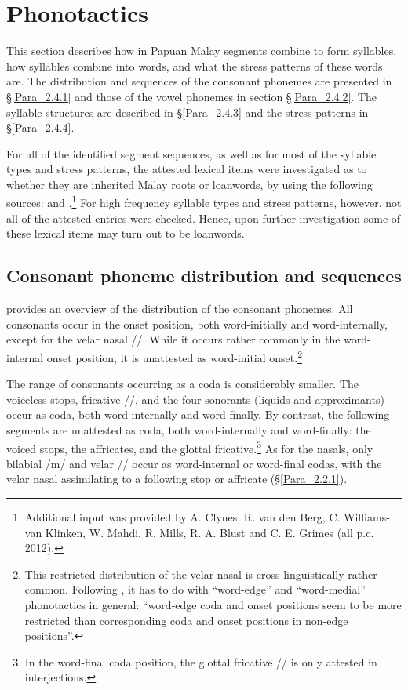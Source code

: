 \section{Phonotactics\label{Para_2.4}}
\largerpage
This section describes how in Papuan Malay segments combine to form syllables, how syllables combine into words, and what the stress patterns of these words are. The distribution and sequences of the consonant phonemes are presented in §\ref{Para_2.4.1} and those of the vowel phonemes in section §\ref{Para_2.4.2}. The syllable structures are described in §\ref{Para_2.4.3} and the stress patterns in §\ref{Para_2.4.4}.



For all of the identified segment sequences, as well as for most of the syllable types and stress patterns, the attested lexical items were investigated as to whether they are inherited Malay roots or loanwords, by using the following sources: \citet{Jones.2007} and \citet{Tadmor.2009}.\footnote{Additional input was provided by A. Clynes, R. van den Berg, C. Williams-van Klinken, W. Mahdi, R. Mills, R. A. Blust and C. E. Grimes (all p.c. 2012).
} For high frequency syllable types and stress patterns, however, not all of the attested entries were checked. Hence, upon further investigation some of these lexical items may turn out to be loanwords.


\subsection{Consonant phoneme distribution and sequences\label{Para_2.4.1}}

 provides an overview of the distribution of the consonant phonemes. All consonants occur in the onset position, both word-initially and word-intern\-ally, except for the velar nasal //. While it occurs rather commonly in the word-internal onset position, it is unattested as word-initial onset.\footnote{This restricted  distribution of the velar nasal is cross-linguistically rather common. Following \citet[7]{Anderson.2013}, it has to do with “word-edge” and “word-medial” phonotactics in general: “word-edge coda and onset positions seem to be more restricted than corresponding coda and onset positions in non-edge positions”.}


The range of consonants occurring as a coda is considerably smaller. The voiceless stops, fricative //, and the four sonorants (liquids and approximants) occur as coda, both word-internally and word-finally. By contrast, the following segments are unattested as coda, both word-internally and word-finally: the voiced stops, the affricates, and the glottal fricative.\footnote{In the word-final coda position, the glottal fricative // is only attested in interjections.} As for the nasals, only bilabial /m/ and velar // occur as word-internal or word-final codas, with the velar nasal assimilating to a following stop or affricate (§\ref{Para_2.2.1}).

